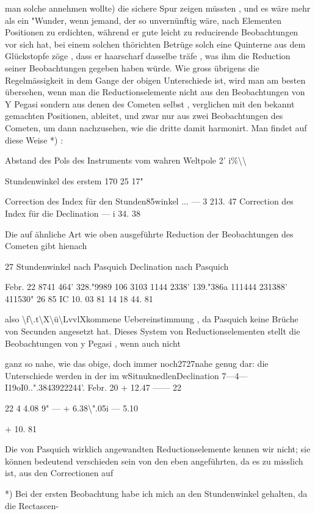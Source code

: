 \documentclass[10pt,a4paper]{article}
\begin{document}
man solche annehmen wollte) die sichere Spur zeigen müssten , und es wäre mehr als ein "Wunder, wenn jemand, der so unvernünftig wäre, nach Elementen Positionen zu erdichten, während er gute leicht zu reducirende Beobachtungen vor sich hat, bei einem solchen thörichten Betrüge solch eine Quinterne aus dem Glückstopfe zöge , dass er haarscharf dasselbe träfe , was ihm die Reduction seiner Beobachtungen gegeben haben würde. Wie gross übrigens die Regelmässigkeit in dem Gange der obigen Unterschiede ist, wird man am besten übersehen, wenn man die Reductionselemente nicht aus den Beobachtungen von Y Pegasi sondern aus denen des Cometen selbst , verglichen mit den bekannt gemachten Positionen, ableitet, und zwar nur aus zwei Beobachtungen des Cometen, um dann nachzusehen, wie die dritte damit harmonirt. Man findet auf diese Weise *) :

Abstand des Pols des Instruments vom wahren Weltpole 2' i\%\textbackslash{}\textbackslash{}

Stundenwinkel des erstem 170\textdegree{} 25 17"

Correction des Index für den Stunden85winkel ... — 3 213. 47 Correction des Index für die Declination — i 34. 38

Die auf ähnliche Art wie oben ausgeführte Reduction der Beobachtungen des Cometen gibt hienach

27 Stundenwinkel nach Pasquich Declination nach Pasquich

Febr. 22 8741\textdegree{} 464' 328."9989 106 3103 1144\textdegree{} 2338' 139."386a 111444\textdegree{} 231388' 411530" 26 85 IC 10. 03 81 14 18 44. 81

also \textbackslash{}f\textbackslash{}.t\textbackslash{}X\textbackslash{}ü\textbackslash{}LvvlXkommene Uebereinstimmung , da Pasquich keine Brüche von Secunden angesetzt hat. Dieses System von Reductionselementen stellt die Beobachtungen von y Pegasi , wenn auch nicht

ganz so nahe, wie das obige, doch immer noch2727nahe genug dar: die Unterschiede werden in der im wSitnuknedlenDeclination 7—4—\textdegree{} I19oI0..".3843922244'. Febr. 20 + 12.47 —— 22

22 4 4.08 9" — + 6.38\textbackslash{}".05i — 5.10

+ 10. 81

Die von Pasquich wirklich angewandten Reductionselemente kennen wir nicht; sie können bedeutend verschieden sein von den eben angeführten, da es zu misslich ist, aus den Correctionen auf

*) Bei der ersten Beobachtung habe ich mich an den Stundenwinkel gehalten, da die Rectascen-
\end{document}
